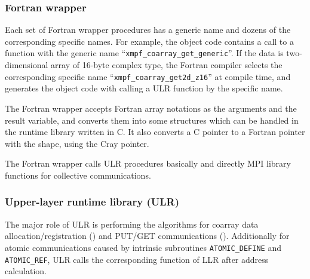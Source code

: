 \subsubsection{Fortran wrapper}

Each set of Fortran wrapper procedures has a generic name 
and dozens of the corresponding specific names.
For example, the object code contains a call to a function with
the generic name ``{\tt xmpf\_coarray\_get\_generic}''.
If the data is two-dimensional array of 16-byte complex type,
the Fortran compiler selects the corresponding specific name 
``{\tt xmpf\_coarray\_get2d\_z16}'' at compile time,
and generates the object code with calling a ULR function 
by the specific name.

The Fortran wrapper accepts Fortran array notations as the arguments 
and the result variable, and converts them into some structures 
which can be handled in the runtime library written in C.
%
It also converts a C pointer to a Fortran pointer with the shape, using
the Cray pointer.

The Fortran wrapper calls ULR procedures basically and 
directly MPI library functions for collective communications.






\subsubsection{Upper-layer runtime library (ULR)}

The major role of ULR is performing the algorithms for coarray data
allocation/registration () and PUT/GET communications ().
Additionally for atomic communications caused by intrinsic subroutines
{\tt ATOMIC\_DEFINE} and {\tt ATOMIC\_REF}, 
ULR calls the corresponding function of LLR after address calculation.

